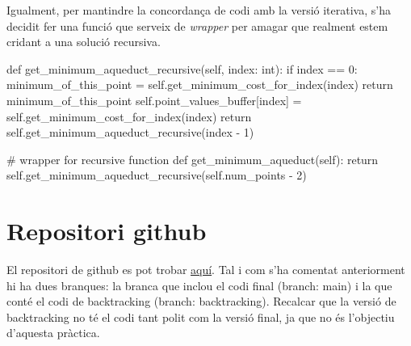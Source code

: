\documentclass[12pt, letterpaper]{article}
\begin{document}
Igualment, per mantindre la concordança de codi amb la versió iterativa, s'ha decidit fer una funció que serveix de \textit{wrapper} per amagar que realment estem cridant a una solució recursiva.
\label{pseudocodirecursiu}
\begin{python}
def get_minimum_aqueduct_recursive(self, index: int):
    if index == 0:
        minimum_of_this_point = self.get_minimum_cost_for_index(index)
        return minimum_of_this_point
    self.point_values_buffer[index] = self.get_minimum_cost_for_index(index)
    return self.get_minimum_aqueduct_recursive(index - 1)

# wrapper for recursive function
def get_minimum_aqueduct(self):
    return self.get_minimum_aqueduct_recursive(self.num_points - 2)
\end{python}

\section{Repositori github}
\label{github}

El repositori de github es pot trobar \href{https://github.com/Algorismia/Aquaeductus}{aquí}. Tal i com s'ha comentat anteriorment hi ha dues branques: la branca que inclou el codi final (branch: main) i la que conté el codi de backtracking (branch: backtracking).
Recalcar que la versió de backtracking no té el codi tant polit com la versió final, ja que no és l'objectiu d'aquesta pràctica.
\end{document}
